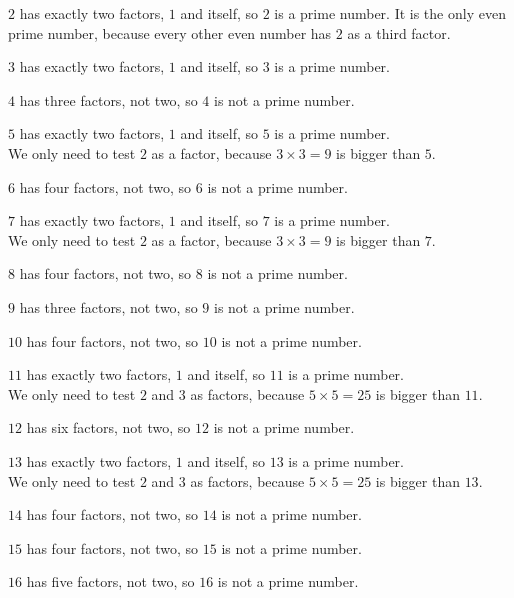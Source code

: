 \documentclass[aspectratio=169]{beamer}
\begin{document}
  {$2$ has exactly two factors, $1$ and itself, so $2$ is a prime number. It is the only even prime number, because every other even number has $2$ as a third factor.}

  {$3$ has exactly two factors, $1$ and itself, so $3$ is a prime number.}

  {$4$ has three factors, not two, so $4$ is not a prime number.}

  {$5$ has exactly two factors, $1$ and itself, so $5$ is a prime number.\\[0.45em]We only need to test $2$ as a factor, because $3\times 3=9$ is bigger than $5$.}

  {$6$ has four factors, not two, so $6$ is not a prime number.}

  {$7$ has exactly two factors, $1$ and itself, so $7$ is a prime number.\\[0.45em]We only need to test $2$ as a factor, because $3\times 3=9$ is bigger than $7$.}

  {$8$ has four factors, not two, so $8$ is not a prime number.}

  {$9$ has three factors, not two, so $9$ is not a prime number.}

  {$10$ has four factors, not two, so $10$ is not a prime number.}

  {$11$ has exactly two factors, $1$ and itself, so $11$ is a prime number.\\[0.45em]We only need to test $2$ and $3$ as factors, because $5\times 5=25$ is bigger than $11$.}

  {$12$ has six factors, not two, so $12$ is not a prime number.}

  {$13$ has exactly two factors, $1$ and itself, so $13$ is a prime number.\\[0.45em]We only need to test $2$ and $3$ as factors, because $5\times 5=25$ is bigger than $13$.}

  {$14$ has four factors, not two, so $14$ is not a prime number.}

  {$15$ has four factors, not two, so $15$ is not a prime number.}

  {$16$ has five factors, not two, so $16$ is not a prime number.}
\end{document}

